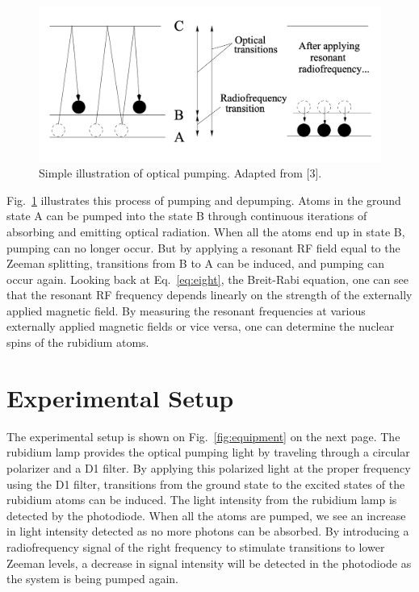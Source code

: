\documentclass[%
 aip,
rsi,%
 amsmath,amssymb,
 reprint,%
author-numerical,%
]{revtex4-1}
\begin{document}
\begin{figure}[H]
\includegraphics[width=1\linewidth]{lateximages/opticalpumping.png} 
\caption{\label{fig:opticalpumping}  Simple illustration of optical pumping. Adapted from [3]. }
\end{figure}

Fig.~\ref{fig:opticalpumping} illustrates this process of pumping and depumping. Atoms in the ground state A can be pumped into the state B through continuous iterations of absorbing and emitting optical radiation. When all the atoms end up in state B, pumping can no longer occur. But by applying a resonant RF field equal to the Zeeman splitting, transitions from B to A can be induced, and pumping can occur again. Looking back at Eq.~\ref{eq:eight}, the Breit-Rabi equation, one can see that the resonant RF frequency depends linearly on the strength of the externally applied magnetic field. By measuring the resonant frequencies at various externally applied magnetic fields or vice versa, one can determine the nuclear spins of the rubidium atoms.

\section{Experimental Setup} \label{3}
The experimental setup is shown on Fig.~\ref{fig:equipment} on the next page. The rubidium lamp provides the optical pumping light by traveling through a circular polarizer and a D1 filter. By applying this polarized light at the proper frequency using the D1 filter, transitions from the ground state to the excited states of the rubidium atoms can be induced. The light intensity from the rubidium lamp is detected by the photodiode. When all the atoms are pumped, we see an increase in light intensity detected as no more photons can be absorbed. By introducing a radiofrequency signal of the right frequency to stimulate transitions to lower Zeeman levels, a decrease in signal intensity will be detected in the photodiode as the system is being pumped again.
\end{document}
